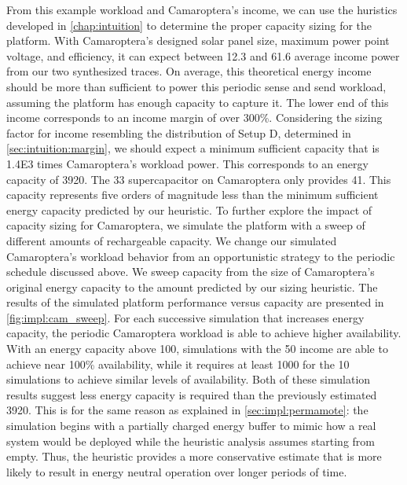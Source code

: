 From this example workload and Camaroptera's income, we can use the huristics developed in \cref{chap:intuition} to determine the proper capacity sizing for the platform.
With Camaroptera's designed solar panel size, maximum power point voltage, and efficiency, 
it can expect between 12.3 and 61.6\ssi{\milli\watt} average income power from our two synthesized traces.
On average, this theoretical energy income should be more than sufficient to power this periodic sense and send workload, assuming the platform has enough capacity to capture it.
The lower end of this income corresponds to an income margin of over 300\%. 
Considering the sizing factor for income resembling the distribution of Setup D, determined in \cref{sec:intuition:margin}, we should expect a minimum sufficient capacity that is \num{1.4E3} times Camaroptera's workload power. 
This corresponds to an energy capacity of 3920\ssi{\milli\Wh}. 
The 33\ssi{\milli\farad} supercapacitor on Camaroptera only provides 41\ssi{\micro\Wh}. This capacity represents five orders of magnitude less than the minimum sufficient energy capacity predicted by our heuristic.
To further explore the impact of capacity sizing for Camaroptera, we simulate the platform with a sweep of different amounts of rechargeable capacity. 
We change our simulated Camaroptera's workload behavior from an opportunistic strategy to the periodic schedule discussed above.
We sweep capacity from the size of Camaroptera's original energy capacity to the amount predicted by our sizing heuristic.
The results of the simulated platform performance versus capacity are presented in \cref{fig:impl:cam_sweep}.
For each successive simulation that increases energy capacity, the periodic Camaroptera workload is able to achieve higher availability.
With an energy capacity above 100\ssi{\milli\watt\hour}, simulations with the 50\ssi[per-mode=symbol]{\milli\watt\per\centi\meter\squared} income are able to achieve near 100\% availability, while it requires at least 1000\ssi{\milli\watt\hour} for the 10\ssi[per-mode=symbol]{\milli\watt\per\centi\meter\squared} simulations to achieve similar levels of availability. 
Both of these simulation results suggest less energy capacity is required than the previously estimated 3920\ssi{\milli\Wh}.
This is for the same reason as explained in \cref{sec:impl:permamote}: the simulation begins with a partially charged energy buffer to mimic how a real system would be deployed while the heuristic analysis assumes starting from empty.
Thus, the heuristic provides a more conservative estimate that is more likely to result in energy neutral operation over longer periods of time.

